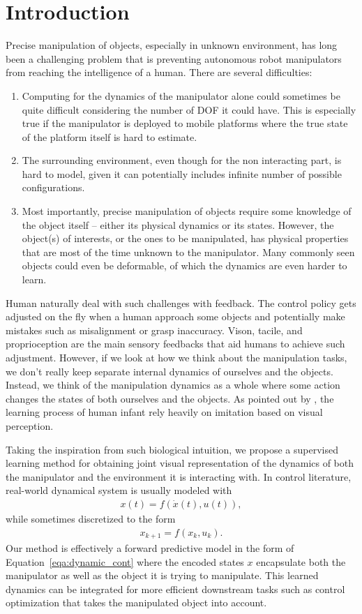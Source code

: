 \documentclass[conference]{IEEEtran}
\begin{document}
\section{Introduction}
Precise manipulation of objects, especially in
unknown environment, has long been a challenging problem that is preventing
autonomous robot manipulators from reaching the intelligence of a human.
There are several difficulties:
\begin{enumerate}
  \item Computing for the dynamics of the manipulator alone could sometimes be
    quite difficult considering the number of DOF it could have. This is especially
    true if the manipulator is deployed to mobile platforms where the true
    state of the platform itself is hard to estimate.
  \item The surrounding environment, even though for the non interacting part,
    is hard to model, given it can potentially includes infinite number of
    possible configurations.
  \item Most importantly, precise manipulation of objects require some knowledge
    of the object itself -- either its physical dynamics or its states.
    However, the object(s) of interests, or the ones to be manipulated,
    has physical properties that are most of the time unknown to the manipulator.
    Many commonly seen objects could even be deformable, of which the dynamics
    are even harder to learn.
\end{enumerate}

Human naturally deal with such challenges with feedback. The control policy gets
adjusted on the fly when a human approach some objects and potentially make
mistakes such as misalignment or grasp inaccuracy. Vison, tacile, and proprioception
are the main sensory feedbacks that aid humans to achieve such adjustment. However,
if we look at how we think about the manipulation tasks, we don't really keep
separate internal dynamics of ourselves and the objects. Instead, we
think of the manipulation dynamics as a whole where some action changes
the states of both ourselves and the objects. As pointed out by \citet{imitation},
the learning process of human infant rely heavily on imitation based on visual
perception.

Taking the inspiration from such biological intuition, we propose a supervised
learning method for obtaining joint visual representation of the dynamics of both
the manipulator and the environment it is interacting with. In control
literature, real-world dynamical system is usually modeled with
\begin{gather}\label{eqa:dynamic_cont}
  x(t) = f(\dot{x}(t), u(t)),
\end{gather}
while sometimes discretized to the form
\begin{gather}\label{eqa:dynamic_disc}
  x_{k+1} = f(x_k, u_k).
\end{gather}
Our method is effectively a forward predictive model in the form of
Equation~\ref{eqa:dynamic_cont} where the encoded states $x$ encapsulate both the
manipulator as well as the object it is trying to manipulate. This learned
dynamics can be integrated for more efficient downstream tasks such as
control optimization that takes the manipulated object into account.
\end{document}
